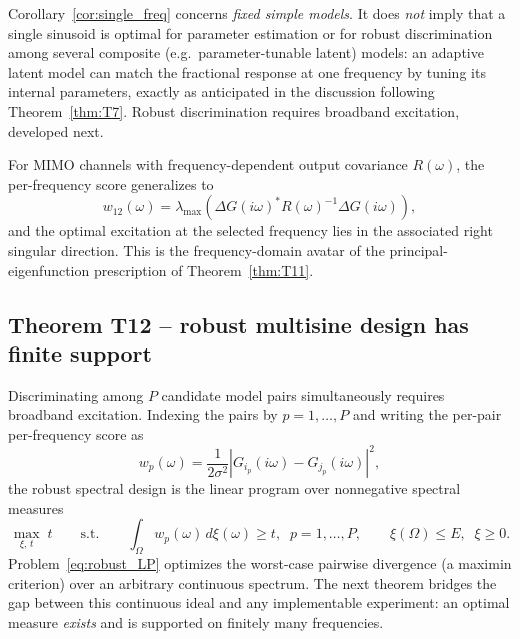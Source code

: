 \begin{remark}
Corollary~\ref{cor:single_freq} concerns \emph{fixed simple models}. It does \emph{not} imply that a single sinusoid is optimal for parameter estimation or for robust discrimination among several composite (e.g.\ parameter-tunable latent) models: an adaptive latent model can match the fractional response at one frequency by tuning its internal parameters, exactly as anticipated in the discussion following Theorem~\ref{thm:T7}. Robust discrimination requires broadband excitation, developed next.
\end{remark}

For MIMO channels with frequency-dependent output covariance \(R(\omega)\), the per-frequency score generalizes to
\begin{equation}
w_{12}(\omega) = \lambda_{\max}\!\left( \Delta G(i\omega)^{*} R(\omega)^{-1} \Delta G(i\omega) \right),
\label{eq:mimo_score}
\end{equation}
and the optimal excitation at the selected frequency lies in the associated right singular direction. This is the frequency-domain avatar of the principal-eigenfunction prescription of Theorem~\ref{thm:T11}.

\subsection{Theorem T12 -- robust multisine design has finite support}

Discriminating among \(P\) candidate model pairs simultaneously requires broadband excitation. Indexing the pairs by \(p = 1, \dots, P\) and writing the per-pair per-frequency score as
\begin{equation}
w_p(\omega) = \frac{1}{2\sigma^2} \left| G_{i_p}(i\omega) - G_{j_p}(i\omega) \right|^2,
\label{eq:wp}
\end{equation}
the robust spectral design is the linear program over nonnegative spectral measures
\begin{equation}
\max_{\xi,\, t}\; t
\qquad\text{s.t.}\qquad
\int_{\Omega} w_p(\omega)\, d\xi(\omega) \ge t,\;\; p = 1, \dots, P,
\qquad \xi(\Omega) \le E,\;\; \xi \ge 0.
\label{eq:robust_LP}
\end{equation}
Problem~\eqref{eq:robust_LP} optimizes the worst-case pairwise divergence (a maximin criterion) over an arbitrary continuous spectrum. The next theorem bridges the gap between this continuous ideal and any implementable experiment: an optimal measure \emph{exists} and is supported on finitely many frequencies.

